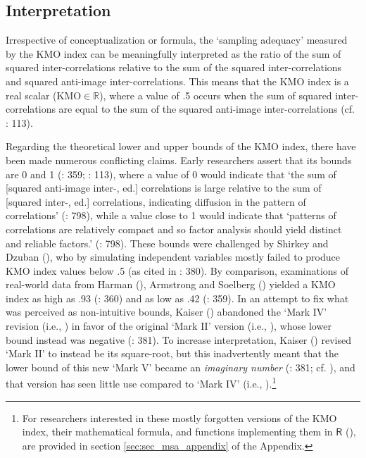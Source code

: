 \documentclass[
  10pt,
  a4paper,
  twoside]{article}
\begin{document}
\subsection{Interpretation}\label{sec:sec_kmo_interpretation}

Irrespective of conceptualization or formula, the `sampling adequacy' measured by the KMO index can be meaningfully interpreted as the ratio of the sum of squared inter-correlations relative to the sum of the squared inter-correlations and squared anti-image inter-correlations. This means that the KMO index is a real scalar (\(\text{KMO} \in \mathbb{R}\)), where a value of .5 occurs when the sum of squared inter-correlations are equal to the sum of the squared anti-image inter-correlations (cf. : 113).

Regarding the theoretical lower and upper bounds of the KMO index, there have been made numerous conflicting claims. Early researchers assert that its bounds are 0 and 1 (: 359; : 113), where a value of 0 would indicate that `the sum of {[}squared anti-image inter-, ed.{]} correlations is large relative to the sum of {[}squared inter-, ed.{]} correlations, indicating diffusion in the pattern of correlations' (: 798), while a value close to 1 would indicate that `patterns of correlations are relatively compact and so factor analysis should yield distinct and reliable factors.' (: 798). These bounds were challenged by Shirkey and Dzuban (), who by simulating independent variables mostly failed to produce KMO index values below .5 (as cited in : 380). By comparison, examinations of real-world data from Harman (), Armstrong and Soelberg () yielded a KMO index as high as .93 (: 360) and as low as .42 (: 359). In an attempt to fix what was perceived as non-intuitive bounds, Kaiser () abandoned the `Mark IV' revision (i.e., ) in favor of the original `Mark II' version (i.e., ), whose lower bound instead was negative (: 381). To increase interpretation, Kaiser () revised `Mark II' to instead be its square-root, but this inadvertently meant that the lower bound of this new `Mark V' became an \emph{imaginary number} (: 381; cf. ), and that version has seen little use compared to `Mark IV' (i.e., ).\footnote{For researchers interested in these mostly forgotten versions of the KMO index, their mathematical formula, and functions implementing them in \(\textsf{R}\) (), are provided in section \ref{sec:sec_msa_appendix} of the Appendix.}
\end{document}
